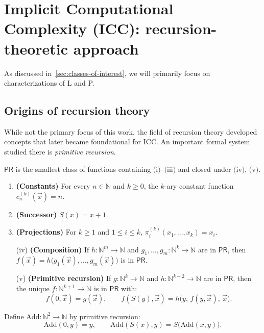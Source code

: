 \chapter{Implicit Computational Complexity (ICC): recursion-theoretic approach}
\label{chap:recursion-theory}

As discussed in~\ref{sec:classes-of-interest}, we will primarily focus on characterizations of L and P.


\section{Origins of recursion theory}
While not the primary focus of this work, the field of recursion theory developed concepts
that later became foundational for ICC\@. An important formal system studied there is \emph{primitive recursion}.

\begin{definition}
\(\mathsf{PR}\) is the smallest class of functions containing \(\text{(i)}\)--\(\text{(iii)}\) and closed under \(\text{(iv)}\), \(\text{(v)}\).
\begin{enumerate}[label=(\roman*)]
\item \textbf{(Constants)} For every \(n\in\mathbb{N}\) and \(k\ge 0\), the \(k\)-ary constant function
      \(c_{n}^{(k)}(\vec x)=n\).
\item \textbf{(Successor)} \(S(x)=x+1\).
\item \textbf{(Projections)} For \(k\ge 1\) and \(1\le i\le k\),
      \(\pi_i^{(k)}(x_1,\dots,x_k)=x_i\).
\item[(iv)] \textbf{(Composition)} If \(h:\mathbb{N}^m\to\mathbb{N}\) and
      \(g_1,\dots,g_m:\mathbb{N}^k\to\mathbb{N}\) are in \(\mathsf{PR}\), then
      \(f(\vec x)=h\big(g_1(\vec x),\dots,g_m(\vec x)\big)\) is in \(\mathsf{PR}\).
\item[(v)] \textbf{(Primitive recursion)} If \(g:\mathbb{N}^k\to\mathbb{N}\) and
      \(h:\mathbb{N}^{k+2}\to\mathbb{N}\) are in \(\mathsf{PR}\), then the unique
      \(f:\mathbb{N}^{k+1}\to\mathbb{N}\) is in \(\mathsf{PR}\) with:
      \[
      f(0,\vec x)=g(\vec x),\qquad
      f(S(y),\vec x)=h\big(y,\,f(y,\vec x),\,\vec x\big).
      \]

\end{enumerate}
\end{definition}

\begin{example}[Addition]
Define \(\mathrm{Add}:\mathbb{N}^2\to\mathbb{N}\) by primitive recursion:
\[
\mathrm{Add}(0,y)=y, \qquad
\mathrm{Add}(S(x),y)=S\big(\mathrm{Add}(x,y)\big).
\]
\end{example}


